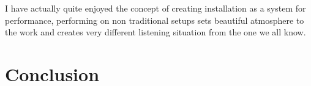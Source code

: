 \documentclass[12pt,a4paper,oneside]{report}
\begin{document}
I have actually quite enjoyed the concept of creating installation as a system for performance, performing on non traditional setups sets beautiful atmosphere to the work and creates very different listening situation from the one we all know. 

\chapter{Conclusion}

\appendix


\onehalfspacing

 

\end{document}
